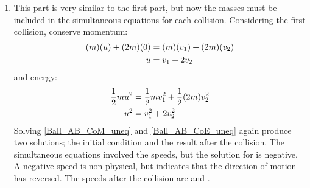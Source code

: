 \begin{problem}[A1969AMIIQ8l]
{\begin{enumerate}
We now have the three velocities:
\begin{align*}
 v_{1} = 0 && w_{2} = 0 && w_{3} = u 
\end{align*}
as the final velocities of the three balls.


	\item This part is very similar to the first part, but now the masses must be included in the simultaneous equations for each collision. Considering the first collision, conserve momentum:
\begin{align} \notag 
(m)(u) + (2m)(0) &= (m)(v_{1}) + (2m)(v_{2}) \\ 
u &= v_{1} + 2v_{2} \label{Ball_AB_CoM_uneq} 
\end{align}
and energy:
\begin{align} \notag 
\frac{1}{2}mu^{2} &= \frac{1}{2}mv_{1}^{2} + \frac{1}{2}(2m)v_{2}^{2} \\ 
u^{2} &= v_{1}^{2} + 2v_{2}^{2} \label{Ball_AB_CoE_uneq} 
\end{align}
Solving \ref{Ball_AB_CoM_uneq} and \ref{Ball_AB_CoE_uneq} again produce two solutions; the initial condition and the result after the collision. The simultaneous equations involved the speeds, but the solution for  is negative. A negative speed is non-physical, but indicates that the direction of motion has reversed. The speeds after the collision are  and .


\end{enumerate}}
\end{problem}
